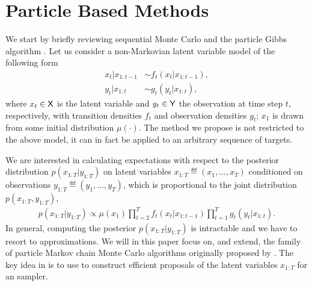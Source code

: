 
\section{Particle Based Methods}
\label{sec:inf:smc}

We start by briefly reviewing sequential Monte Carlo \citep{gordon1993novel,doucet2001sequential} and the particle Gibbs algorithm \citep{andrieuDH2010}. Let us consider a non-Markovian latent variable model of the following form
\begin{subequations}
	\label{eq:ssm}
	\begin{alignat}{2}
		x_t | x_{1:t-1} &\sim f_t(x_t | x_{1:t-1}), \\
		y_t | x_{1:t} &\sim g_t(y_t|x_{1:t}),
	\end{alignat}
\end{subequations}
where $x_t \in \mathsf{X}$ is the latent variable and $y_t \in \mathsf{Y}$ the observation at time step $t$, respectively,
with transition densities $f_t$ and observation densities $g_t$; $x_1$ is drawn from some initial distribution $\mu(\cdot)$. The method we propose is not restricted to the above model, it can in fact be applied to an arbitrary sequence of targets.


We are interested in calculating expectations with respect to the posterior distribution $p(x_{1:T}|y_{1:T})$ on latent variables $x_{1:T} \eqdef (x_1,\ldots,x_T)$ conditioned on observations $y_{1:T} \eqdef (y_1,\ldots,y_T)$, which is proportional to the joint distribution $p(x_{1:T}, y_{1:T})$,
\begin{align}
	\label{eq:jointdistribution}
	p(x_{1:T} | y_{1:T}) \propto  \mu(x_1) \prod_{t=2}^T f_t(x_t | x_{1:t-1}) \prod_{t=1}^T g_t(y_t|x_{1:t}).\nonumber
\end{align}
In general, computing the posterior $p(x_{1:T}|y_{1:T})$ is intractable and we have to resort to approximations. We will in this paper focus on, and extend, the family of particle Markov chain Monte Carlo algorithms originally proposed by \citet{andrieuDH2010}. The key idea in \pmcmc is to use \smc to construct efficient proposals of the latent variables $x_{1:T}$ for an \mcmc sampler.

